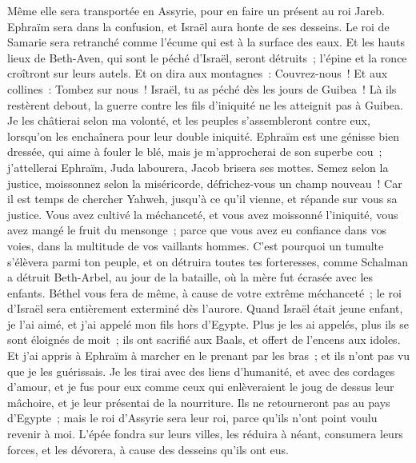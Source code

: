 \begin{multicols}{2}
Même elle sera transportée en Assyrie, pour en faire un présent au roi Jareb. Ephraïm sera dans la confusion, et Israël aura honte de ses desseins.
Le roi de Samarie sera retranché comme l'écume qui est à la surface des eaux.
Et les hauts lieux de Beth-Aven, qui sont le péché d'Israël, seront détruits~; l'épine et la ronce croîtront sur leurs autels. Et on dira aux montagnes~: Couvrez-nous~! Et aux collines~: Tombez sur nous~!
Israël, tu as péché dès les jours de Guibea~! Là ils restèrent debout, la guerre contre les fils d'iniquité ne les atteignit pas à Guibea.
Je les châtierai selon ma volonté, et les peuples s'assembleront contre eux, lorsqu'on les enchaînera pour leur double iniquité.
Ephraïm est une génisse bien dressée, qui aime à fouler le blé, mais je m'approcherai de son superbe cou~; j'attellerai Ephraïm, Juda labourera, Jacob brisera ses mottes.
Semez selon la justice, moissonnez selon la miséricorde, défrichez-vous un champ nouveau~! Car il est temps de chercher Yahweh, jusqu'à ce qu'il vienne, et répande sur vous sa justice.
Vous avez cultivé la méchanceté, et vous avez moissonné l'iniquité, vous avez mangé le fruit du mensonge~; parce que vous avez eu confiance dans vos voies, dans la multitude de vos vaillants hommes.
C'est pourquoi un tumulte s'élèvera parmi ton peuple, et on détruira toutes tes forteresses, comme Schalman a détruit Beth-Arbel, au jour de la bataille, où la mère fut écrasée avec les enfants.
Béthel vous fera de même, à cause de votre extrême méchanceté~; le roi d'Israël sera entièrement exterminé dès l'aurore.
\VerseOne{}Quand Israël était jeune enfant, je l'ai aimé, et j'ai appelé mon fils hors d'Egypte.
Plus je les ai appelés, plus ils se sont éloignés de moit~; ils ont sacrifié aux Baals, et offert de l'encens aux idoles.
Et j'ai appris à Ephraïm à marcher en le prenant par les bras~; et ils n'ont pas vu que je les guérissais.
Je les tirai avec des liens d'humanité, et avec des cordages d'amour, et je fus pour eux comme ceux qui enlèveraient le joug de dessus leur mâchoire, et je leur présentai de la nourriture.
Ils ne retourneront pas au pays d'Egypte~; mais le roi d'Assyrie sera leur roi, parce qu'ils n'ont point voulu revenir à moi.
L'épée fondra sur leurs villes, les réduira à néant, consumera leurs forces, et les dévorera, à cause des desseins qu'ils ont eus.

\end{multicols}
